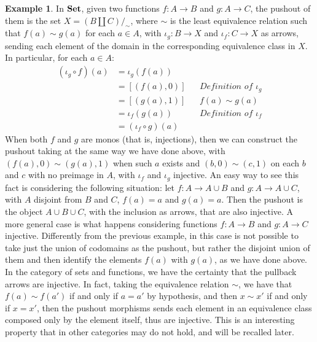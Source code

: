 \documentclass[a4paper, twoside,openright]{report}
\theoremstyle{plain}
\theoremstyle{definition}
\newtheorem{example}[theorem]{Example}
\begin{document}
\begin{example}\label{ex:po_in_set}
    \color{blue}
    In $\mathbf{Set}$, given two functions $f: A \rightarrow B$ and $g: A \rightarrow C$, the pushout of them is the set $X = (B \coprod C) /_\sim$, where $\sim$ is the least equivalence relation such that $f(a) \sim g(a)$ for each $a \in A$, with $\iota_g:B \rightarrow X$ and $\iota_f : C \rightarrow X$ as arrows, sending each element of the domain in the corresponding equivalence class in $X$. In particular, for each $a \in A$:
    \begin{align*}
        (\iota_g \circ f) (a)
                        &= \iota_g(f(a))    &&\\
                        &= [(f(a), 0)]           && \textit{Definition of $\iota_g$} \\
                        &= [(g(a), 1)]           && f(a) \sim g(a) \\
                        &= \iota_f(g(a))    && \textit{Definition of $\iota_f$} \\
                        &= (\iota_f \circ g) (a) &&
    \end{align*}
    When both $f$ and $g$ are monos (that is, injections), then we can construct the pushout taking at the same way we have done above, with $(f(a), 0) \sim (g(a), 1)$ when such $a$ exists and $(b, 0) \sim (c, 1)$ on each $b$ and $c$ with no preimage in $A$, with $\iota_f$ and $\iota_g$ injective.
    An easy way to see this fact is considering the following situation: let $f: A \rightarrow A \cup B$ and $g: A \rightarrow A \cup C$, with $A$ disjoint from $B$ and $C$, $f(a)= a$ and $g(a) = a$. Then the pushout is the object $A \cup B \cup C$, with the inclusion as arrows, that are also injective.
    A more general case is what happens considering functions $f: A \rightarrow B$ and $g: A \rightarrow C$ injective. Differently from the previous example, in this case is not possible to take just the union of codomains as the pushout, but rather the disjoint union of them and then identify the elements $f(a)$ with $g(a)$, as we have done above. In the category of sets and functions, we have the certainty that the pullback arrows are injective. In fact, taking the equivalence relation $\sim$, we have that $f(a) \sim f(a')$ if and only if $a = a'$ by hypothesis, and then $x \sim x'$ if and only if $x = x'$, then the pushout morphisms sends each element in an equivalence class composed only by the element itself, thus are injective.
    This is an interesting property that in other categories may do not hold, and will be recalled later.
\end{example}
\end{document}
